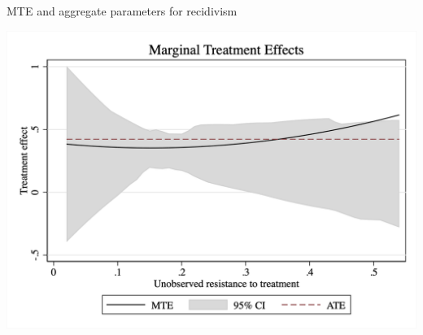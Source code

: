 \documentclass{beamer}
\begin{document}
\begin{frame}{MTE and aggregate parameters for recidivism}

  \includegraphics[width=\textwidth]{./lecture_includes/mte_recid__2.png}

\end{frame}
\end{document}
